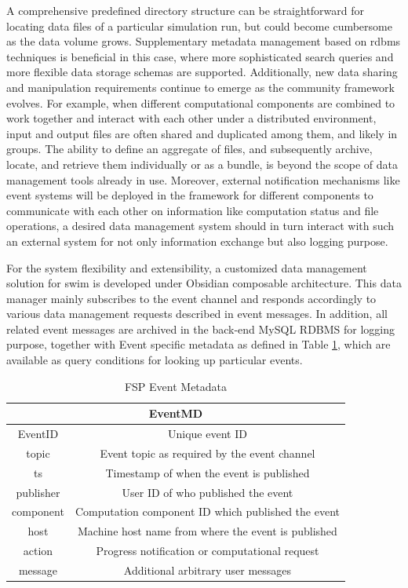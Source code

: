 A comprehensive predefined directory structure can be  
straightforward for locating data files of a particular simulation run, 
but could become cumbersome as the data volume grows. Supplementary
metadata management based on \ac{rdbms} techniques is beneficial in this 
case, where more sophisticated search queries and more flexible 
data storage schemas are supported. 
Additionally, new data sharing and manipulation requirements continue to 
emerge as the community framework evolves. 
For example, when different computational
components are combined to work together and interact with each other under a
distributed environment, input and output files are often shared and
duplicated among them, and likely in groups. The ability to define
an aggregate of files, and subsequently archive, locate, and retrieve them
individually or as a bundle, is beyond the scope of data management tools
already in use. Moreover, external notification mechanisms like event systems
will be deployed in the framework for different components to communicate with
each other on information like computation status and file operations,
a desired data management system should in turn interact with such an
external system for not only information exchange but also logging purpose.

For the system flexibility and extensibility, a customized data management
solution for \ac{swim} is developed under Obsidian \cite{obsidian} composable
architecture. This data manager mainly subscribes to the event channel and
responds accordingly to various data management requests described in event
messages. In addition, all related event messages are archived in
the back-end MySQL RDBMS for logging purpose, together with
Event specific metadata as defined in Table \ref{eventmd}, which are
available as query conditions for looking up particular events.
\begin{table}
\begin{center}
\begin{tabular}{|c|c|} \hline
\multicolumn{2}{|c|}{EventMD} \\ \hline \hline
EventID     &   Unique event ID \\ \hline
topic       &   Event topic as required by the event channel \\ \hline
ts          &   Timestamp of when the event is published    \\ \hline
publisher   &   User ID of who published the event      \\ \hline
component   &   Computation component ID which published the event \\ \hline
host        &   Machine host name from where the event is published \\ \hline
action      &   Progress notification or computational request  \\ \hline
message     &   Additional arbitrary user messages  \\ \hline
\end{tabular}
\caption{\label{eventmd} FSP Event Metadata}
\end{center}
\end{table}

